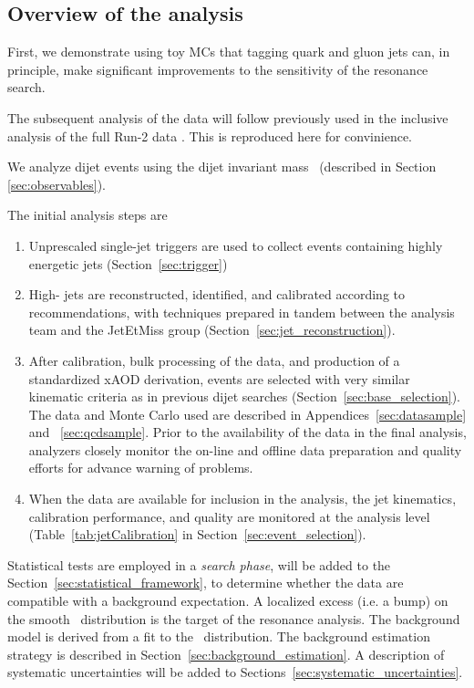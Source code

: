 \subsection{Overview of the analysis}
\label{sec:overview}

First, we demonstrate using toy MCs that tagging quark and gluon jets can, in principle, make significant 
improvements to the sensitivity of the resonance search.

The subsequent analysis of the data will follow previously used in the inclusive analysis of the full Run-2 data 
\cite{EXOT-2016-21,Nishu:2646455}. This is reproduced here for convinience. 

We analyze dijet events using the dijet invariant mass \mjj\  (described in Section \ref{sec:observables}).

The initial analysis steps are

\begin{enumerate}
\item Unprescaled single-jet triggers are used to collect events containing
highly energetic jets (Section~\ref{sec:trigger})
\item High-\pT\xspace jets are reconstructed, identified, and calibrated according to recommendations, with techniques
prepared in tandem between the analysis team and the
JetEtMiss group (Section~\ref{sec:jet_reconstruction}).
\item After calibration, bulk processing of the data, and production of a standardized xAOD derivation, events are selected with very similar kinematic 
criteria as in previous dijet searches (Section~\ref{sec:base_selection}). The data and Monte Carlo used are described in
Appendices~\ref{sec:datasample} and ~\ref{sec:qcdsample}. Prior to the availability of the data in the final
analysis, analyzers closely monitor the on-line and offline data preparation and
quality efforts for advance warning of problems.%
\item When the data are available for inclusion in the analysis, the jet kinematics, calibration performance, 
and quality are monitored at the analysis level (Table~\ref{tab:jetCalibration} in Section~\ref{sec:event_selection}).
\end{enumerate}

Statistical tests are employed in a
\textit{search phase}, will be added to the Section~\ref{sec:statistical_framework}, to determine whether the 
data are compatible with a background expectation. 
A localized excess (i.e. a bump) on the smooth \mjj\  distribution
is the target of the resonance analysis.
The background model is derived from a fit to the \mjj\ distribution.
The background estimation strategy is described in Section~\ref{sec:background_estimation}.
A description of systematic uncertainties will be added to 
Sections~\ref{sec:systematic_uncertainties}. 

